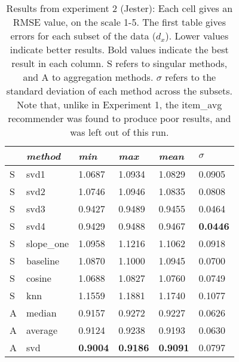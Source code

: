 \begin{table}[p]
  \begin{tabular*}{\textwidth}{ l p{3cm} p{2cm} p{2cm} p{2cm} p{2cm} }
    \toprule
      ~ & \emph{method} & 
      \emph{min} & \emph{max} & \emph{mean} & $\sigma$\\
    \midrule
    S & svd1       &   1.0687  &  1.0934  &  1.0829  &  0.0905  \\
    S & svd2       &   1.0746  &  1.0946  &  1.0835  &  0.0808  \\
    S & svd3       &   0.9427  &  0.9489  &  0.9455  &  0.0464  \\
    S & svd4       &   0.9429  &  0.9488  &  0.9467  &  \textbf{0.0446}  \\
    S & slope\_one &   1.0958  &  1.1216  &  1.1062  &  0.0918  \\
    S & baseline   &   1.0870  &  1.1000  &  1.0945  &  0.0700  \\
    S & cosine     &   1.0688  &  1.0827  &  1.0760  &  0.0749  \\
    S & knn        &   1.1559  &  1.1881  &  1.1740  &  0.1077  \\
    \midrule
    A & median     &   0.9157  &  0.9272  &  0.9227  &  0.0626  \\    
    A & average    &   0.9124  &  0.9238  &  0.9193  &  0.0630  \\
    A & svd        &   \textbf{0.9004}  &  \textbf{0.9186}  &  \textbf{0.9091}  &  0.0797  \\
    \bottomrule
  \end{tabular*}
  \vspace{2em}

  \caption[Results from Experiment 2]{
    Results from experiment 2 (Jester):
    Each cell gives an RMSE value, on the scale 1-5.
    The first table gives errors for each subset of the data ($d_x$).
    Lower values indicate better results.
    Bold values indicate the best result in each column.
    S refers to singular methods, and A to aggregation methods.
    $\sigma$ refers to the standard deviation of each method across the subsets.
    Note that, unlike in Experiment 1, the item\_avg recommender
    was found to produce poor results, and was left out of this run.
  }
  \label{table:results:e2}
\end{table}

